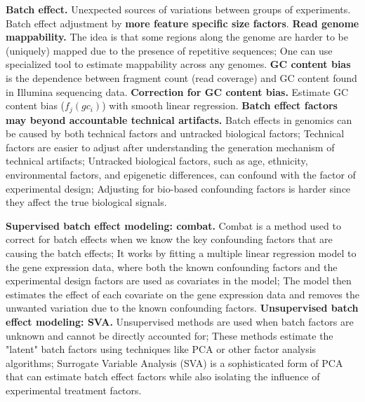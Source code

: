 \vspace{0.1em}\noindent
\textbf{Batch effect.} Unexpected sources of variations between groups of experiments. Batch effect adjustment by \textbf{more feature specific size factors}. \textbf{Read genome mappability.} The idea is that some regions along the genome are harder to be (uniquely) mapped due to the presence of repetitive sequences; One can use specialized tool to estimate mappability across any genomes. \textbf{GC content bias} is the dependence between fragment count (read coverage) and GC content found in Illumina sequencing data. \textbf{Correction for GC content bias.} Estimate GC content bias ($f_j(gc_i)$) with smooth linear regression. \textbf{Batch effect factors may beyond accountable technical artifacts.} Batch effects in genomics can be caused by both technical factors and untracked biological factors; Technical factors are easier to adjust after understanding the generation mechanism of technical artifacts; Untracked biological factors, such as age, ethnicity, environmental factors, and epigenetic differences, can confound with the factor of experimental design;  Adjusting for bio-based confounding factors is harder since they affect the true biological signals. 

\vspace{0.1em}\noindent
\textbf{Supervised batch effect modeling: combat.} Combat is a method used to correct for batch effects when we know the key confounding factors that are causing the batch effects; It works by fitting a multiple linear regression model to the gene expression data, where both the known confounding factors and the experimental design factors are used as covariates in the model; The model then estimates the effect of each covariate on the gene expression data and removes the unwanted variation due to the known confounding factors. \textbf{Unsupervised batch effect modeling: SVA.} Unsupervised methods are used when batch factors are unknown and cannot be directly accounted for; These methods estimate the "latent" batch factors using techniques like PCA or other factor analysis algorithms; Surrogate Variable Analysis (SVA) is a sophisticated form of PCA that can estimate batch effect factors while also isolating the influence of experimental treatment factors. 

